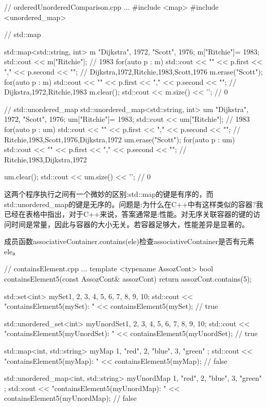 
\begin{cpp}
// orderedUnorderedComparison.cpp
...
#include <map>
#include <unordered_map>

// std::map

std::map<std::string, int> m {{"Dijkstra", 1972}, {"Scott", 1976}};
m["Ritchie"]= 1983;
std::cout << m["Ritchie"]; // 1983
for(auto p : m) std::cout << "{" << p.first << "," << p.second << "}";
							// {Dijkstra,1972},{Ritchie,1983},{Scott,1976}
m.erase("Scott");
for(auto p : m) std::cout << "{" << p.first << "," << p.second << "}";
								// {Dijkstra,1972},{Ritchie,1983}
m.clear();
std::cout << m.size() << '\n'; // 0

// std::unordered_map
std::unordered_map<std::string, int> um {{"Dijkstra", 1972}, {"Scott", 1976}};
um["Ritchie"]= 1983;
std::cout << um["Ritchie"]; // 1983
for(auto p : um) std::cout << "{" << p.first << "," << p.second << "}";
								// {Ritchie,1983},{Scott,1976},{Dijkstra,1972}
um.erase("Scott");
for(auto p : um) std::cout << "{" << p.first << "," << p.second << "}";
								// {Ritchie,1983},{Dijkstra,1972}

um.clear();
std::cout << um.size() << '\n'; // 0
\end{cpp}

这两个程序执行之间有一个微妙的区别:std::map的键是有序的，而std::unordered\_map的键是无序的。问题是:为什么在C++中有这样类似的容器?我已经在表格中指出，对于C++来说，答案通常是:性能。对无序关联容器的键的访问时间是常量，因此与容器的大小无关。若容器足够大，性能差异是显著的。


成员函数associativeContainer.contains(ele)检查associativeContainer是否有元素ele。


\begin{cpp}
// containsElement.cpp
...
template <typename AssozCont>
bool containsElement5(const AssozCont& assozCont) {
	return assozCont.contains(5);
}

std::set<int> mySet{1, 2, 3, 4, 5, 6, 7, 8, 9, 10};
std::cout << "containsElement5(mySet): "
		  << containsElement5(mySet); // true

std::unordered_set<int> myUnordSet{1, 2, 3, 4, 5, 6, 7, 8, 9, 10};
std::cout << "containsElement5(myUnordSet): "
		  << containsElement5(myUnordSet); // true

std::map<int, std::string> myMap{ {1, "red"}, {2, "blue"}, {3, "green"} };
std::cout << "containsElement5(myMap): "
		  << containsElement5(myMap); // false

std::unordered_map<int, std::string> myUnordMap{ {1, "red"}, {2, "blue"},
												 {3, "green"} };
std::cout << "containsElement5(myUnordMap): "
		  << containsElement5(myUnordMap); // false
\end{cpp}


